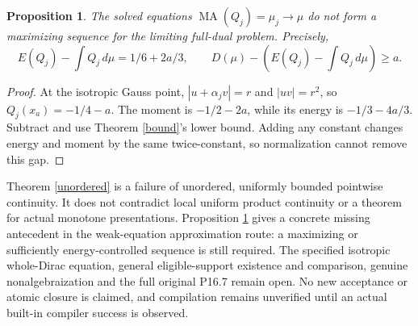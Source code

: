 \documentclass[11pt]{article}
\newtheorem{proposition}[theorem]{Proposition}
\newcommand{\MA}{\operatorname{MA}}
\begin{document}
\begin{proposition}\label{gap}
The solved equations $\MA(Q_j)=\mu_j\to\mu$ do not form a maximizing
sequence for the limiting full-dual problem. Precisely,
\[
 E(Q_j)-\int Q_j\,d\mu=1/6+2a/3,\qquad
 D(\mu)-\left(E(Q_j)-\int Q_j\,d\mu\right)\ge a.
\]
\end{proposition}
\begin{proof}
At the isotropic Gauss point, $|u+\alpha_jv|=r$ and $|uv|=r^2$,
so $Q_j(x_a)=-1/4-a$. The moment is $-1/2-2a$, while its energy
is $-1/3-4a/3$. Subtract and use Theorem \ref{bound}'s lower bound.
Adding any constant changes energy and moment by the same twice-constant,
so normalization cannot remove this gap.
\end{proof}

Theorem \ref{unordered} is a failure of unordered, uniformly bounded
pointwise continuity. It does not contradict local uniform product
continuity or a theorem for actual monotone presentations. Proposition
\ref{gap} gives a concrete missing antecedent in the weak-equation
approximation route: a maximizing or sufficiently energy-controlled
sequence is still required. The specified isotropic whole-Dirac equation,
general eligible-support existence and comparison, genuine nonalgebraization
and the full original P16.7 remain open. No new acceptance or atomic
closure is claimed, and compilation remains unverified until an actual
built-in compiler success is observed.
\end{document}
